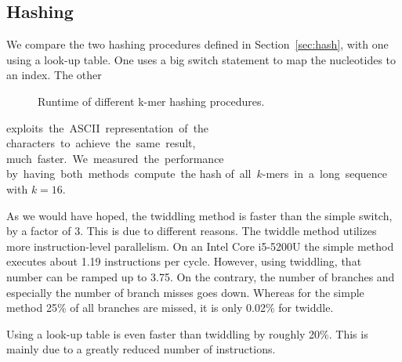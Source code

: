 \documentclass[10pt,letterpaper]{article}
\begin{document}
\vspace*{2cm}
\newpage{}
\subsection{Hashing}

We compare the two hashing procedures defined in Section~\ref{sec:hash}, with one using a look-up table. One uses a big switch statement to map the nucleotides to an index. The other

\begin{wrapfigure}[16]{r}{65mm}
    \caption{Runtime of different k-mer hashing procedures.}
\end{wrapfigure}
\noindent exploits~the~ASCII~representation~of~the characters~to~achieve~the~same~result, much~faster.~We~measured~the~performance by~having~both~methods~compute~the hash of~all~$k$-mers~in~a~long~sequence with $k = 16$.

As we would have hoped, the twiddling method is faster than the simple switch, by a factor of 3. This is due to different reasons. The twiddle method utilizes more instruction-level parallelism. On an Intel Core i5-5200U the simple method executes about 1.19 instructions per cycle. However, using twiddling, that number can be ramped up to 3.75. On the contrary, the number of branches and especially the number of branch misses goes down. Whereas for the simple method 25\% of all branches are missed, it is only 0.02\% for twiddle.

Using a look-up table is even faster than twiddling by roughly 20\%. This is mainly due to a greatly reduced number of instructions.
\end{document}
